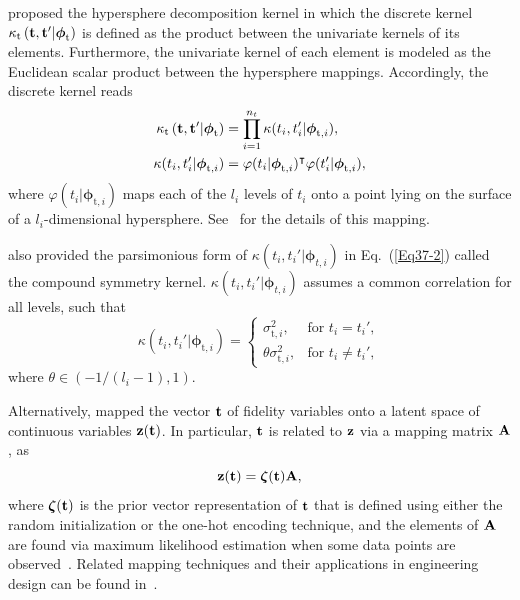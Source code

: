 \documentclass[iicol,sn-basic]{sn-jnl}%
\theoremstyle{thmstyleone}%
\theoremstyle{thmstyletwo}
\theoremstyle{thmstylethree}
\begin{document}
\begin{linenumbers}
\cite{Zhou2011} proposed the hypersphere decomposition kernel in which the discrete kernel $\kappa_\text{t}\left({\bf t},{\bf t}'|{\boldsymbol \phi}_\text{t}\right)$ is defined as the product between the univariate kernels of its elements.
Furthermore, the univariate kernel of each element is modeled as the Euclidean scalar product between the hypersphere mappings.
Accordingly, the discrete kernel reads
\begin{subequations}\label{Eq37}
	\begin{align}
		\kappa_\text{t}\left({\bf t},{\bf t}'|{\boldsymbol \phi}_\text{t}\right) & = \prod_{i=1}^{n_t}\kappa(t_i,t_i'|{\boldsymbol \phi}_{\text{t},i})
		\label{Eq37-1},\\
		\kappa(t_i,t_i'|{\boldsymbol \phi}_{\text{t},i})& =\varphi(t_i|{\boldsymbol \phi}_{\text{t},i})^\intercal \varphi(t_i'|{\boldsymbol \phi}_{\text{t},i})
		\label{Eq37-2},
	\end{align}
\end{subequations}
where $\varphi(t_i|{\boldsymbol \phi}_{\text{t},i})$ maps each of  the $l_i$ levels of $t_i$ onto a point lying on the surface of a $l_i$-dimensional hypersphere.
See~\cite{Zhou2011} for the details of this mapping.

\cite{Roustant2020} also provided the parsimonious form of $\kappa(t_i,t_i'|{\boldsymbol \phi}_{t,i})$ in Eq.~(\ref{Eq37-2}) called the compound symmetry kernel.
$\kappa(t_i,t_i'|{\boldsymbol \phi}_{t,i})$ assumes a common correlation for all levels, such that
\begin{equation}\label{Eq38}
	\kappa(t_i,t_i'|{\boldsymbol \phi}_{\text{t},i}) = 
	\begin{cases}
		\sigma_{\text{t},i}^2, & \text{for } t_i = t_i', \\
		\theta \sigma_{\text{t},i}^2, & \text{for } t_i \neq t_i',
	\end{cases}
\end{equation}
where $\theta \in (-1/(l_i-1),1)$.

Alternatively, \cite{Foumani2023} mapped the vector ${\bf t}$ of fidelity variables onto a latent space of continuous variables ${\bf z}({\bf t})$.
In particular, ${\bf t}$ is related to ${\bf z}$ via a mapping matrix ${\bf A}$, as~\citep{Foumani2023,Oune2021}
\begin{equation}\label{Eq39}
	{\bf z}({\bf t}) = {\boldsymbol \zeta}({\bf t}) {\bf A},
\end{equation}
where ${\boldsymbol \zeta}({\bf t})$ is the prior vector representation of ${\bf t}$ that is defined using either the random initialization or the one-hot encoding technique, and the elements of ${\bf A}$ are found via maximum likelihood estimation when some data points are observed~\citep{Oune2021}.
Related mapping techniques and their applications in engineering design can be found in~\cite{Deng2017,YZhang2020,GarridoMerchan2020,Pelamatti2021,Vangelatos2021,LWang2021,Saves2023}.


\end{linenumbers}
\end{document}
